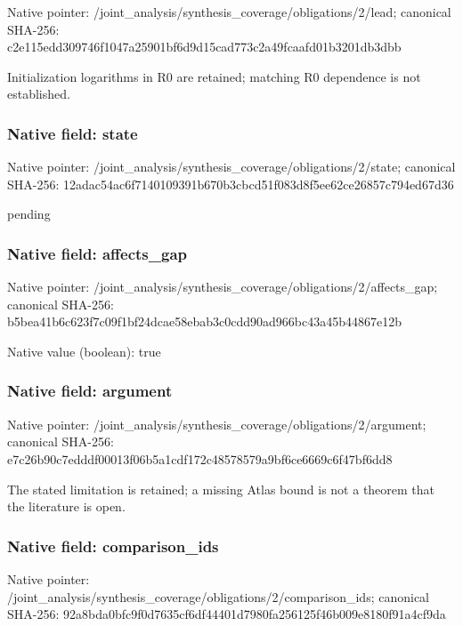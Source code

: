 \documentclass[10pt,a4paper]{article}
\begin{document}
Native pointer: /joint\_analysis/synthesi\allowbreak{}s\_coverage/obligations/2\allowbreak{}/lead; canonical SHA-256: c2e115edd309746f1047a259\allowbreak{}01bf6d9d15cad773c2a49fca\allowbreak{}afd01b3201db3dbb


Initialization logarithms in R0 are retained; matching R0 dependence is not established.


\subsubsection{Native field: state}


Native pointer: /joint\_analysis/synthesi\allowbreak{}s\_coverage/obligations/2\allowbreak{}/state; canonical SHA-256: 12adac54ac6f7140109391b6\allowbreak{}70b3cbcd51f083d8f5ee62ce\allowbreak{}26857c794ed67d36


pending


\subsubsection{Native field: affects\_gap}


Native pointer: /joint\_analysis/synthesi\allowbreak{}s\_coverage/obligations/2\allowbreak{}/affects\_gap; canonical SHA-256: b5bea41b6c623f7c09f1bf24\allowbreak{}dcae58ebab3c0cdd90ad966b\allowbreak{}c43a45b44867e12b



Native value (boolean): true



\subsubsection{Native field: argument}


Native pointer: /joint\_analysis/synthesi\allowbreak{}s\_coverage/obligations/2\allowbreak{}/argument; canonical SHA-256: e7c26b90c7edddf00013f06b\allowbreak{}5a1cdf172c48578579a9bf6c\allowbreak{}e6669c6f47bf6dd8


The stated limitation is retained; a missing Atlas bound is not a theorem that the literature is open.


\subsubsection{Native field: comparison\_ids}


Native pointer: /joint\_analysis/synthesi\allowbreak{}s\_coverage/obligations/2\allowbreak{}/comparison\_ids; canonical SHA-256: 92a8bda0bfc9f0d7635cf6df\allowbreak{}44401d7980fa256125f46b00\allowbreak{}9e8180f91a4cf9da
\end{document}
